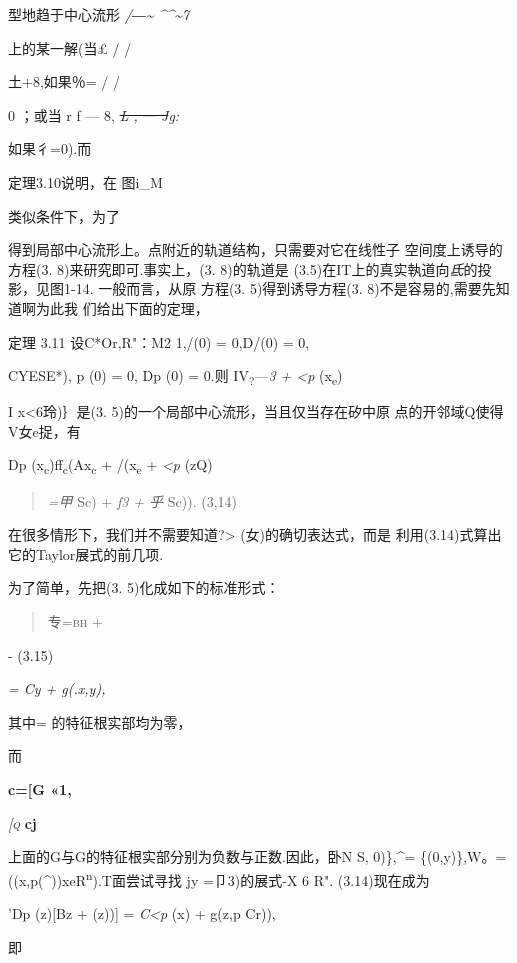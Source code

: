 \documentclass{article}
\begin{document}
型地趋于中心流形 \emph{/―{\textasciitilde{} \^{}\^{}}\textasciitilde{}7}

上的某一解(当£ / /

土+8,如果％= / /

0 ；或当 r f --- 8, \sout{\emph{L ,} 一 \emph{J}}\emph{g:}

如果彳=0).而

定理3.10说明，在 图i\_M

类似条件下，为了

得到局部中心流形上。点附近的轨道结构，只需要对它在线性子
空间度上诱导的方程(3. 8)来研究即可.事实上，(3. 8)的轨道是
(3.5)在IT上的真实執道向\emph{氐}的投影，见图1-14. 一般而言，从原 方程(3.
5)得到诱导方程(3. 8)不是容易的,需要先知道啊为此我 们给出下面的定理，

定理 3.11 设C*Or,R"：M2 1,/(0) = 0,D/(0) = 0,

CYESE*), p (0) = 0, Dp (0) = 0.则 IV\textsubscript{?}---\emph{3 +
\textless{}p} (x\textsubscript{e})

I x\textless{}6玲)｝是(3. 5)的一个局部中心流形，当且仅当存在矽中原
点的开邻域Q使得V女e捉，有

Dp (x\textsubscript{c})ff\textsubscript{c}(Ax\textsubscript{c} +
/(x\textsubscript{e} + \emph{\textless{}p} (zQ)

\begin{quote}
\emph{=甲} Sc) + \emph{f3 + 乎} Sc)). (3,14)
\end{quote}

在很多情形下，我们并不需要知道?\textgreater{} (女)的确切表达式，而是
利用(3.14)式算出它的Taylor展式的前几项.

为了简单，先把(3. 5)化成如下的标准形式：

\begin{quote}
专=\textsc{bh +}
\end{quote}

- (3.15)

\emph{= Cy + g(.x,y),}

其中= 的特征根实部均为零，

而

\textbf{c={[}G «1,}

\emph{\textsc{{[}q}} \textbf{cj}

上面的G与G的特征根实部分别为负数与正数.因此，卧N S, 0)\},\^{}=
\{(0,y)\},W。= ((x,p(\^{}))\textbar{}xeR\textsuperscript{n}).T面尝试寻找
jy =卩3)的展式-X 6 R". (3.14)现在成为

'Dp (z){[}Bz + (z)){]} = \emph{C\textless{}p} (x) + g(z,p Cr)),

即
\end{document}
